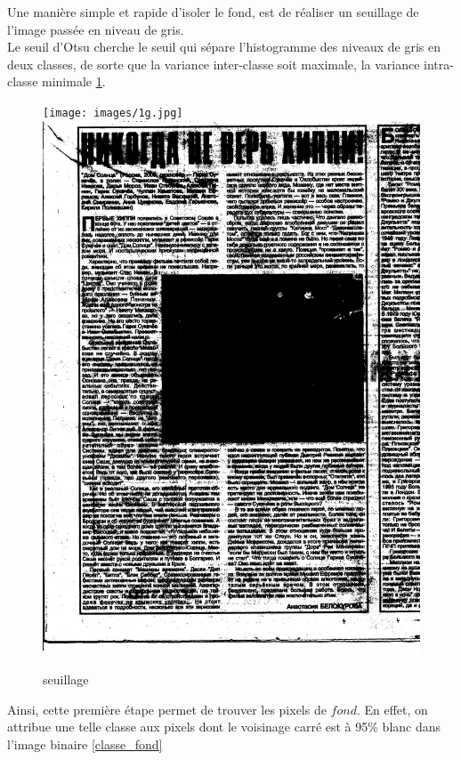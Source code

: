 \documentclass{book}
\begin{document}
Une manière simple et rapide d'isoler le fond, est de réaliser un seuillage de l'image passée en niveau de gris.\\
Le seuil d'Otsu cherche le seuil qui sépare l'histogramme des niveaux de gris en deux classes, de sorte que la variance inter-classe soit maximale, la variance intra-classe
minimale \ref{seuillage}.\\

\begin{figure}[H]
\begin{center}
\texttt{[image: images/1g.jpg]}
\includegraphics[scale=0.075]{images/1g_binary.jpg}
\end{center}
\caption{seuillage}
\label{seuillage}
\end{figure}

Ainsi, cette première étape permet de trouver les pixels de $fond$. En effet, on attribue une telle classe aux pixels dont le voisinage carré est à 95\% blanc 
dans l'image binaire \ref{classe_fond}
\end{document}
